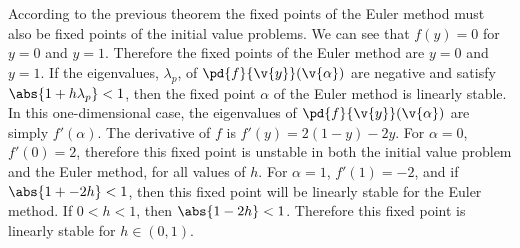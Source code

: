 \documentclass[11pt]{article}
\begin{document}
\begin{enumerate}
\begin{enumerate}
                According to the previous theorem the fixed points of the Euler
                method must also be fixed points of the initial value problems.
                We can see that $f(y) = 0$ for $y = 0$ and $y = 1$.
                Therefore the fixed points of the Euler method are $y = 0$ and
                $y = 1$.
                If the eigenvalues, $\lambda_p$, of $\pd{f}{\v{y}}(\v{\alpha})$ are negative and
                satisfy $\abs{1 + h\lambda_p} < 1$, then the fixed point
                $\alpha$ of the Euler method is linearly stable.
                In this one-dimensional case, the eigenvalues of
                $\pd{f}{\v{y}}(\v{\alpha})$ are simply $f'(\alpha)$.
                The derivative of $f$ is $f'(y) = 2(1-y) - 2y$.
                For $\alpha = 0$, $f'(0) = 2$, therefore this fixed point is
                unstable in both the initial value problem and the Euler method,
                for all values of $h$.
                For $\alpha = 1$, $f'(1) = -2$, and if $\abs{1 + -2h} < 1$, then
                this fixed point will be linearly stable for the Euler method.
                If $0 < h < 1$, then $\abs{1 - 2h} < 1$.
                Therefore this fixed point is linearly stable for $h \in (0, 1)$.
        \end{enumerate}
\end{enumerate}
\end{document}
